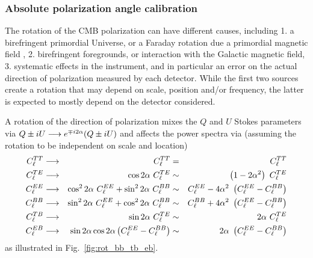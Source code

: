 \documentclass[PICOReport.tex]{subfiles}
\begin{document}
\subsubsection{Absolute polarization angle calibration}
\label{sec:angle}

The rotation of the CMB polarization can have different causes,
including 1. a birefringent primordial Universe, or a Faraday rotation
due a primordial magnetic field \citep{Pogosian+2018}, 2. birefringent
foregrounds, or interaction with the Galactic magnetic field,
3. systematic effects in the instrument, and in particular an error on
the actual direction of polarization measured by each detector.  
While the first two sources create a rotation that may depend on scale,
position and/or frequency, the latter is expected to mostly depend on
the detector considered. 

A rotation {\prang} of the direction of polarization mixes the $Q$ and $U$ Stokes parameters via
$Q\pm iU \longrightarrow e^{\mp i 2 \alpha} (Q\pm iU)$
and affects the power spectra via (assuming the rotation to be independent on scale and location)
\begin{subequations}
\begin{align}
C^{TT}_\ell &\longrightarrow & C^{TT}_\ell                                             &= & C^{TT}_\ell \\
C^{TE}_\ell &\longrightarrow & \cos 2\prang\  C^{TE}_\ell                                &\sim & \left(1 - 2\prang^2\right)\ C^{TE}_\ell \\
C^{EE}_\ell &\longrightarrow & \cos^2 2\prang\  C^{EE}_\ell + \sin^2 2\prang\  C^{BB}_\ell &\sim & C^{EE}_\ell - 4\prang^2\ \left(C^{EE}_\ell - C^{BB}_\ell\right) \\
C^{BB}_\ell &\longrightarrow & \sin^2 2\prang\  C^{EE}_\ell + \cos^2 2\prang\  C^{BB}_\ell &\sim & C^{BB}_\ell + 4\prang^2\ \left(C^{EE}_\ell - C^{BB}_\ell\right)\\
C^{TB}_\ell &\longrightarrow & \sin 2\prang\  C^{TE}_\ell                                &\sim & 2\prang\  C^{TE}_\ell \\
C^{EB}_\ell &\longrightarrow & \sin 2\prang \cos 2\prang \left(C^{EE}_\ell -  C^{BB}_\ell\right)  &\sim & 2\prang\ \left(C^{EE}_\ell -  C^{BB}_\ell\right)
\end{align}
\end{subequations}
as illustrated in Fig.~\ref{fig:rot_bb_tb_eb}.
\end{document}
